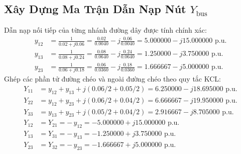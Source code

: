 \documentclass[12pt,a4paper,oneside]{report}
\begin{document}
\subsection{Xây Dựng Ma Trận Dẫn Nạp Nút $Y_{\text{bus}}$}
Dẫn nạp nối tiếp của từng nhánh đường dây được tính chính xác:
\begin{align}
y_{12} &= \frac{1}{0.02 + j0.06} = \frac{0.02}{0.0040} - j\frac{0.06}{0.0040} = 5.000000 - j15.000000\text{ p.u.} \\
y_{13} &= \frac{1}{0.08 + j0.24} = \frac{0.08}{0.0640} - j\frac{0.24}{0.0640} = 1.250000 - j3.750000\text{ p.u.} \\
y_{23} &= \frac{1}{0.06 + j0.18} = \frac{0.06}{0.0360} - j\frac{0.18}{0.0360} = 1.666667 - j5.000000\text{ p.u.}
\end{align}
Ghép các phần tử đường chéo và ngoài đường chéo theo quy tắc KCL:
\begin{align}
Y_{11} &= y_{12} + y_{13} + j(0.06/2 + 0.05/2) = 6.250000 - j18.695000\text{ p.u.} \\
Y_{22} &= y_{12} + y_{23} + j(0.06/2 + 0.04/2) = 6.666667 - j19.950000\text{ p.u.} \\
Y_{33} &= y_{13} + y_{23} + j(0.05/2 + 0.04/2) = 2.916667 - j8.705000\text{ p.u.} \\
Y_{12} &= Y_{21} = -\, y_{12} = -5.000000 + j15.000000\text{ p.u.} \\
Y_{13} &= Y_{31} = -\, y_{13} = -1.250000 + j3.750000\text{ p.u.} \\
Y_{23} &= Y_{32} = -\, y_{23} = -1.666667 + j5.000000\text{ p.u.}
\end{align}
\end{document}
